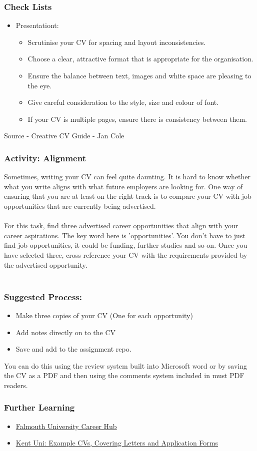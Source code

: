 \begin{frame}
	\frametitle{Check Lists}
	\begin{itemize}
		\item Presentationt:
  		\begin{itemize}
			\item Scrutinise your CV for spacing and layout inconsistencies.
			\item Choose a clear, attractive format that is appropriate for the organisation.
			\item Ensure the balance between text, images and white space are pleasing to the eye.
			\item Give careful consideration to the style, size and colour of font.
			\item If your CV is multiple pages, ensure there is consistency between them.
    		 \end{itemize}
	\end{itemize}
	Source - Creative CV Guide - Jan Cole
\end{frame}

\begin{frame}
	\frametitle{Activity: Alignment}
	\small{
Sometimes, writing your CV can feel quite daunting. It is hard to know whether what you write aligns with what future employers are looking for. One way of ensuring that you are at least on the right track is to compare your CV with job opportunities that are currently being advertised. \\~\\
For this task, find three advertised career opportunities that align with your career aspirations. The key word here is 'opportunities'. You don't have to just find job opportunities, it could be funding, further studies and so on. Once you have selected three, cross reference your CV with the requirements provided by the advertised opportunity.  \\~\\
 } 
\end{frame}
	
\begin{frame}
	\frametitle{Suggested Process: }
	\begin{itemize}
		\item Make three copies of your CV (One for each opportunity)
		\item Add notes directly on to the CV 
		\item Save and add to the assignment repo.
	\end{itemize}

You can do this using the review system built into Microsoft word or by saving the CV as a PDF and then using the comments system included in must PDF readers.	

\end{frame}


\begin{frame}
	\frametitle{Further Learning}
	\begin{itemize}
		\item \href{http://careerhub.falmouth.ac.uk}{Falmouth University Career Hub}
		\item \href{https://www.kent.ac.uk/careers/cv/cvexamples.htm}{Kent Uni: Example CVs, Covering Letters and Application Forms}
	\end{itemize}
\end{frame}



